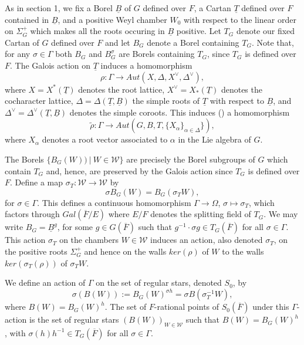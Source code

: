 \documentclass[12pt,letterpaper]{amsart}
\begin{document}
As in section 1, we fix a Borel $\underline{B}$ of $G$
defined over ${F}$, a Cartan
$\underline{T}$ defined over $F$ contained in $\underline{B}$,
and a positive Weyl chamber $W_0$ with respect to the linear order
on $\Sigma_G^+$ which makes all the roots occuring in $\underline{B}$
positive. Let $T_G$ denote our fixed Cartan of $G$ defined over $F$
and let $B_G$ denote a Borel containing
$T_G$. Note that, for any $\sigma\in\Gamma$ both $B_G$ and
$B_G^\sigma$ are Borels containing $T_G$, since $T_G$ is
defined over $F$.
The Galois action on $\underline{T}$ induces a homomorphism
\[
\rho:\Gamma\rightarrow Aut(X,\Delta,X^{\vee},\Delta^{\vee}),
\tag{2.1a}
\]
where $X=X^*(\underline{T})$ denotes the root lattice,
$X^{\vee}=X_*(\underline{T})$ denotes the cocharacter lattice,
$\Delta=\Delta(\underline{T},\underline{B})$ the simple roots of
$\underline{T}$ with respect to $\underline{B}$,
and $\Delta^{\vee}=\Delta^\vee(\underline{T},\underline{B})$
denotes the simple coroots.
This induces (\cite{Sp79}) a homomorphism
\[
\tilde{\rho}:\Gamma\rightarrow
Aut(G,B,T,\{X_{\alpha}\}_{\alpha\in\Delta}\}),
\tag{2.1b}
\]
where $X_\alpha$ denotes a root vector associated to $\alpha$
in the Lie algebra of $G$.

The Borels
$\{{B}_G(W))\ |\ W\in {\mathcal W}\}$ are precisely the Borel
subgroups of $G$ which contain ${T}_G$ and, hence, are preserved by the
Galois action since ${T}_G$ is defined over $F$. Define
a map $\sigma_T:{\mathcal W}\rightarrow {\mathcal W}$ by
\[
\sigma {B}_G(W)={B}_G(\sigma_T W),
\]
for $\sigma\in\Gamma$. This defines a continuous homomorphism
$\Gamma\rightarrow \Omega$,
$\sigma\longmapsto \sigma_T$, which factors through $Gal(\overline{F}/E)$
where $E/F$ denotes the splitting field of $T_G$.
We may write $B_G=\underline{B}^g$,
for some $g\in G(\overline{F})$ such that
$g^{-1}\cdot \sigma g\in T_G(\overline{F})$ for all $\sigma\in \Gamma$.
This action $\sigma_T$ on the chambers $W\in {\mathcal W}$ induces an action,
also denoted $\sigma_T$, on the positive roots $\Sigma_G^+$ and hence on
the walls $ker(\rho)$ of $W$ to the walls
$ker(\sigma_T(\rho))$ of
$\sigma_TW$.

We define an action of
$\Gamma$ on the set of regular stars, denoted $S_0$, by
\[
\sigma (B(W)):={B}_G(W)^{\sigma h}
=\sigma{B}(\sigma_T^{-1}W),
\tag{2.2}
\]
where $B(W)=B_G(W)^h$.
The set of $F$-rational points of $S_0(\overline{F})$
under this $\Gamma$-action is the set
of regular stars $(B(W))_{W\in {\mathcal W}}$ such that
$B(W)=B_G(W)^h$, with $\sigma(h)h^{-1}\in T_G(\overline{F})$
for all $\sigma\in\Gamma$.
\end{document}
